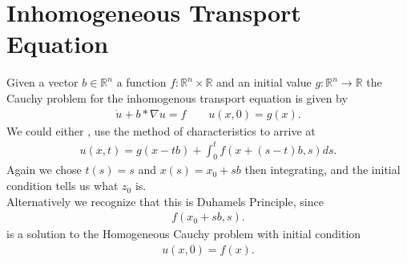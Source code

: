 \section{Inhomogeneous Transport Equation}
\begin{Theorem}
 Given a vector $b \in  \mathbb{R}^{n}$ a function $f : \mathbb{R}^{n} \times \mathbb{R}$ and an initial value 
 $g : \mathbb{R}^{n} \to \mathbb{R} $ the Cauchy problem for the inhomogenous transport equation is given by 
 \begin{align*}
  \dot{u} + b * \nabla u = f \qquad u(x,0)=g(x)
 .\end{align*}
 We could either , use the method of characteristics to arrive at 
 \begin{align*}
  u(x,t) = g(x-tb) + \int_0^{t} f(x+(s-t)b,s) ds
 .\end{align*}
 Again we chose $t(s) = s$ and $x(s) = x_{0} + sb$ then integrating, and the initial condition tells us what $z_{0}$ is.\\
 Alternatively we recognize that this is Duhamels Principle, since 
 \begin{align*}
  f(x_{0}+sb,s)
 .\end{align*}
 is a solution to the Homogeneous Cauchy problem with initial condition 
 \begin{align*}
  u(x,0) =f(x)
 .\end{align*}
\end{Theorem}
